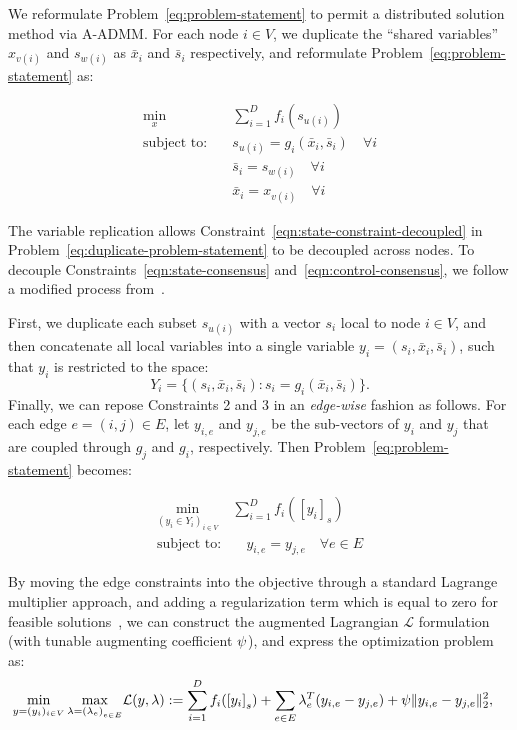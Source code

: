 We reformulate Problem~\eqref{eq:problem-statement} to permit a distributed solution method via A-ADMM.  For each node $i\in V$, we duplicate the ``shared variables'' $x_{v\left(i\right)}$ and $s_{w\left(i\right)}$ as $\bar{x}_i$ and $\bar{s}_i$ respectively, and reformulate Problem~\eqref{eq:problem-statement} as:

\begin{align}
  \label{eq:duplicate-problem-statement}
  \min_{x} & \quad \sum_{i = 1}^D f_i\left(s_{u\left(i\right)}\right) \\
  \text{subject to:} & \quad s_{u\left(i\right)} = g_i\left(\bar{x}_i, \bar{s}_i\right) \quad \forall i  \label{eqn:state-constraint-decoupled} \\
   & \quad \bar{s}_i = s_{w\left(i\right)} \quad \forall i \label{eqn:state-consensus} \\
   & \quad \bar{x}_i = x_{v\left(i\right)} \quad \forall i \label{eqn:control-consensus} 
\end{align}

The variable replication allows Constraint~\eqref{eqn:state-constraint-decoupled} in Problem~\eqref{eq:duplicate-problem-statement} to be decoupled across nodes. To decouple Constraints~\eqref{eqn:state-consensus} and~\eqref{eqn:control-consensus}, we follow a modified process from~\cite{Wei2013On}.

First, we duplicate each subset $s_{u\left(i\right)}$ with a vector $s_i$ local to node $i \in V$, and then concatenate all local variables into a single variable $y_i = \left(s_i, \bar{x}_i, \bar{s}_i\right)$, such that $y_i$ is restricted to the space:
\[
Y_i = \{\left(s_i,\bar{x}_i, \bar{s}_i\right) : s_i = g_i\left(\bar{x}_i, \bar{s}_i\right)\}.
\]
Finally, we can repose Constraints 2 and 3 in an \emph{edge-wise} fashion as follows. For each edge $e = \left(i,j\right) \in E$, let $y_{i,e}$ and $y_{j,e}$ be the sub-vectors of $y_i$ and $y_j$ that are coupled through $g_j$ and $g_i$, respectively. Then Problem~\eqref{eq:problem-statement} becomes:

\begin{align}
  \label{eq:edge-problem-statement}
  \min_{(y_i \in Y_i)_{i \in V}} & \sum_{i = 1}^D f_i\left(\left[y_i\right]_{s}\right) \\
  \text{subject to:} & \quad y_{i,e} = y_{j,e} \quad \forall e\in E
\end{align}

By moving the edge constraints into the objective through a standard Lagrange multiplier approach, and adding a regularization term which is equal to zero for feasible solutions~\cite{Boyd2010a}, we can construct the augmented Lagrangian $\mathcal{L}$ formulation (with tunable augmenting coefficient $\psi$), and express the optimization problem as:
\begin{align}
  \label{eq:lagrangian}
  \min_{y = (y_i)_{i \in V}} \max_{\lambda = \left(\lambda_e\right)_{e \in E}} & \mathcal{L} \left(y,\lambda\right) := \sum_{i = 1}^D f_i\left(\left[y_i\right]_{s}\right) + \sum_{e\in E} \lambda_e^T \left(y_{i,e} - y_{j,e}\right) + \augterm \|y_{i,e} - y_{j,e}\|_2^2,
\end{align}

